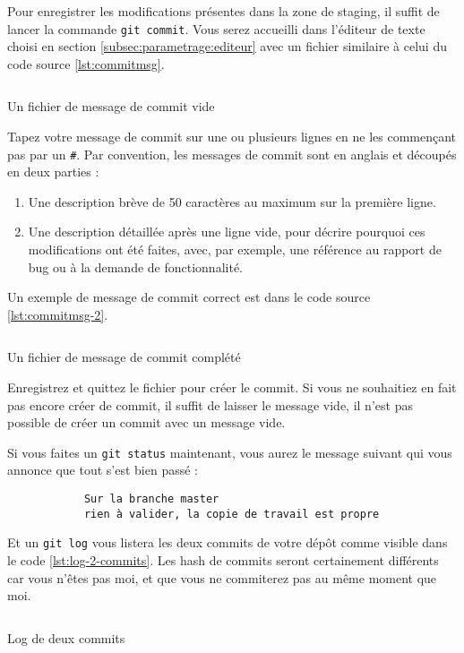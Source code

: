 \documentclass[10pt,a4paper,french]{article}
\renewcommand{\listoflistingscaption}{Table des codes sources}
\begin{document}
        Pour enregistrer les modifications présentes dans la zone de staging, il suffit de lancer la commande \verb|git commit|. Vous serez accueilli dans l'éditeur de texte choisi en section \ref{subsec:parametrage:editeur} avec un fichier similaire à celui du code source \ref{lst:commitmsg}.

        \begin{listing}[ht]
            \inputminted{sh}{ressources/COMMITMSG-1.txt}
            \caption{Un fichier de message de commit vide}
            \label{lst:commitmsg}
        \end{listing}

        Tapez votre message de commit sur une ou plusieurs lignes en ne les commençant pas par un \verb|#|. Par convention, les messages de commit sont en anglais et découpés en deux parties :
        \begin{enumerate}
            \item Une description brève de 50 caractères au maximum sur la première ligne.
            \item Une description détaillée après une ligne vide, pour décrire pourquoi ces modifications ont été faites, avec, par exemple, une référence au rapport de bug ou à la demande de fonctionnalité.
        \end{enumerate}
        Un exemple de message de commit correct est dans le code source \ref{lst:commitmsg-2}.

        \begin{listing}[ht]
            \inputminted{sh}{ressources/COMMITMSG-2.txt}
            \caption{Un fichier de message de commit complété}
            \label{lst:commitmsg-2}
        \end{listing}

        Enregistrez et quittez le fichier pour créer le commit.
        Si vous ne souhaitiez en fait pas encore créer de commit, il suffit de laisser le message vide, il n'est pas possible de créer un commit avec un message vide.

        Si vous faites un \verb|git status| maintenant, vous aurez le message suivant qui vous annonce que tout s'est bien passé :
        \begin{verbatim}
            Sur la branche master
            rien à valider, la copie de travail est propre
        \end{verbatim}

        Et un \verb|git log| vous listera les deux commits de votre dépôt comme visible dans le code \ref{lst:log-2-commits}. Les hash de commits seront certainement différents car vous n'êtes pas moi, et que vous ne commiterez pas au même moment que moi.

        \begin{listing}[ht]
            \inputminted{text}{ressources/log-2-commits.txt}
            \caption{Log de deux commits}
            \label{lst:log-2-commits}
        \end{listing}

\listoflistings
    \addcontentsline{toc}{section}{\listoflistingscaption}
\end{document}

